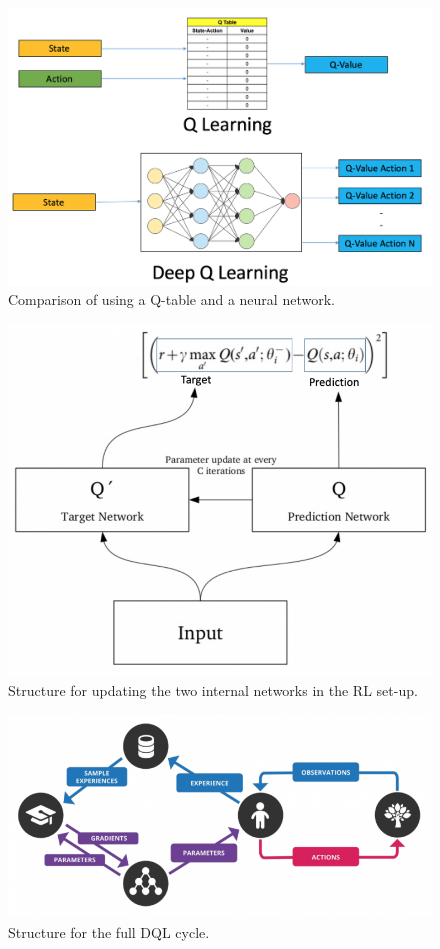 \documentclass[runningheads,envcountsect]{llncs}
\begin{document}
\begin{figure}[h!]
  \centering
  \includegraphics[scale=0.3]{img/dql.png}
  \caption{Comparison of using a Q-table and a neural network.}
  \label{fig:dql}
\end{figure}

\begin{figure}[h!]
  \centering
  \includegraphics[scale=0.3]{img/rl_double_model.png}
  \caption{Structure for updating the two internal networks in the RL set-up.}
  \label{fig:rl_dm}
\end{figure}

\begin{figure}[h!]
  \centering
  \includegraphics[scale=0.5]{img/dql_full.png}
  \caption{Structure for the full DQL cycle.}
  \label{fig:dql_full}
\end{figure}
\end{document}
